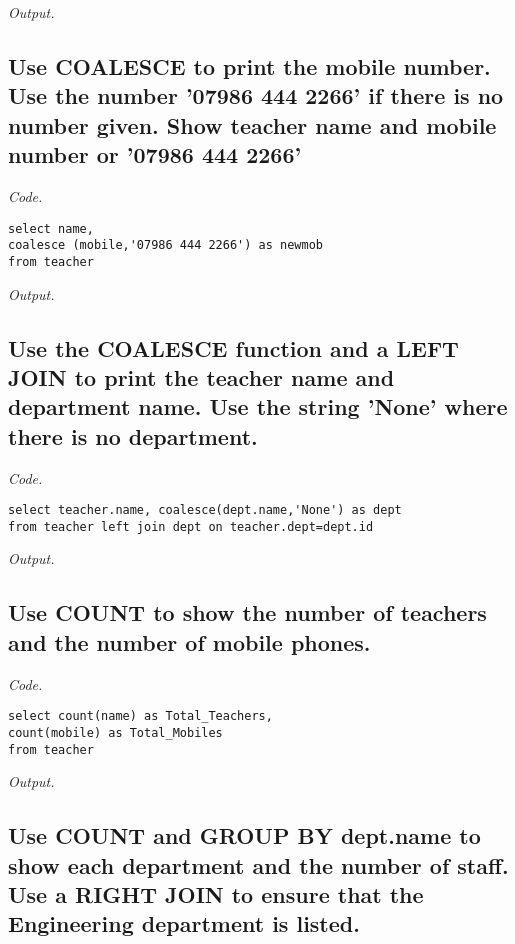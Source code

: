 \documentclass[12pt]{article}
\begin{document}
\textit{Output.}\\

\subsection{Use COALESCE to print the mobile number. Use the number '07986 444 2266' if there is no number given. Show teacher name and mobile number or '07986 444 2266'}

\textit{Code.}

\begin{lstlisting}[showstringspaces=false]
select name,
coalesce (mobile,'07986 444 2266') as newmob
from teacher
\end{lstlisting}

\textit{Output.}\\

\subsection{Use the COALESCE function and a LEFT JOIN to print the teacher name and department name. Use the string 'None' where there is no department.}

\textit{Code.}

\begin{lstlisting}[showstringspaces=false]
select teacher.name, coalesce(dept.name,'None') as dept
from teacher left join dept on teacher.dept=dept.id
\end{lstlisting}

\textit{Output.}\\

\subsection{Use COUNT to show the number of teachers and the number of mobile phones.}

\textit{Code.}

\begin{lstlisting}[showstringspaces=false]
select count(name) as Total_Teachers,
count(mobile) as Total_Mobiles 
from teacher
\end{lstlisting}

\textit{Output.}\\

\subsection{Use COUNT and GROUP BY dept.name to show each department and the number of staff. Use a RIGHT JOIN to ensure that the Engineering department is listed.}
\end{document}
